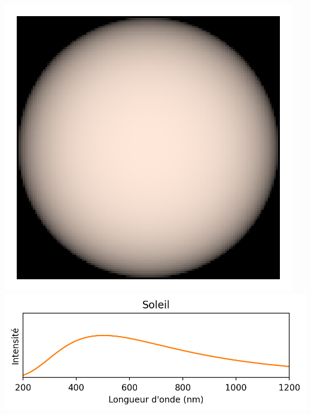 \documentclass[12pt,a4paper,fleqn]{article}
\begin{document}
\begin{center}
\newcommand{\localheight}{75 pt}
\includegraphics[height=\localheight]{images/star_sun.png}
\includegraphics[height=\localheight]{images/spectrum_star_curve_sun.png}


\end{center}
\end{document}
